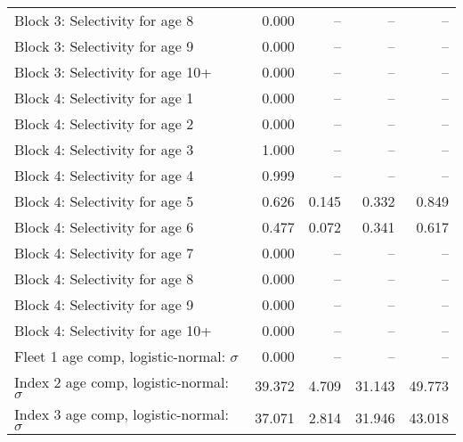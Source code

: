 \documentclass[
]{article}
\begin{document}
\begin{landscape}
\begin{longtable}[t]{lrrrr}
Block 3: Selectivity for age 8 & 0.000 & -- & -- & --\\
Block 3: Selectivity for age 9 & 0.000 & -- & -- & --\\
Block 3: Selectivity for age 10+ & 0.000 & -- & -- & --\\
Block 4: Selectivity for age 1 & 0.000 & -- & -- & --\\
\addlinespace
Block 4: Selectivity for age 2 & 0.000 & -- & -- & --\\
Block 4: Selectivity for age 3 & 1.000 & -- & -- & --\\
Block 4: Selectivity for age 4 & 0.999 & -- & -- & --\\
Block 4: Selectivity for age 5 & 0.626 & 0.145 & 0.332 & 0.849\\
Block 4: Selectivity for age 6 & 0.477 & 0.072 & 0.341 & 0.617\\
\addlinespace
Block 4: Selectivity for age 7 & 0.000 & -- & -- & --\\
Block 4: Selectivity for age 8 & 0.000 & -- & -- & --\\
Block 4: Selectivity for age 9 & 0.000 & -- & -- & --\\
Block 4: Selectivity for age 10+ & 0.000 & -- & -- & --\\
Fleet 1 age comp, logistic-normal: $\sigma$ & 0.000 & -- & -- & --\\
\addlinespace
Index 2 age comp, logistic-normal: $\sigma$ & 39.372 & 4.709 & 31.143 & 49.773\\
Index 3 age comp, logistic-normal: $\sigma$ & 37.071 & 2.814 & 31.946 & 43.018\\*
\end{longtable}
\end{landscape}
\end{document}
